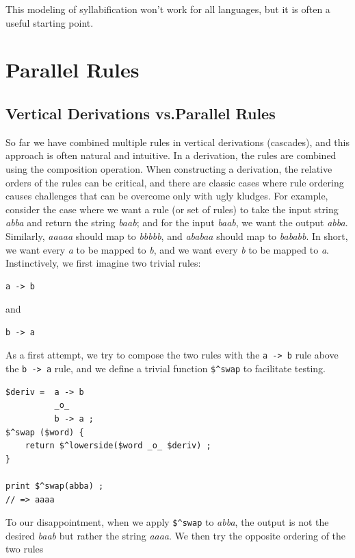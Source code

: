This modeling of syllabification won't work for all languages, but it is often a
useful starting point.

\section{Parallel Rules}

\subsection{Vertical Derivations vs.\@ Parallel Rules}

So far we have combined multiple rules in vertical derivations (cascades), and this
approach is often natural and intuitive.  In a derivation, the rules are combined
using the composition operation.  When constructing a derivation, the relative orders of the
rules can be critical, and there are classic cases where rule ordering causes challenges
that can be overcome only with ugly kludges.  For example, consider the case where we want
a rule (or set of rules) to take the input string \emph{abba} and return the string
\emph{baab}; and for the input \emph{baab}, we want the output \emph{abba}.  Similarly,
\emph{aaaaa} should map to \emph{bbbbb}, and \emph{ababaa} should map to \emph{bababb}.  In
short, we want every \emph{a} to be mapped to \emph{b}, and we want every \emph{b} to be
mapped to \emph{a}.  Instinctively, we first imagine two trivial rules:


\begin{Verbatim}
a -> b 
\end{Verbatim}

\noindent
and

\begin{Verbatim}
b -> a
\end{Verbatim}

As a first attempt, we try to compose the two rules with the \verb!a -> b! rule above the
\verb!b -> a! rule, and we define a trivial function \verb!$^swap! to facilitate testing.


\begin{Verbatim}
$deriv =  a -> b
          _o_
          b -> a ;
$^swap ($word) { 
    return $^lowerside($word _o_ $deriv) ;
}

print $^swap(abba) ;
// => aaaa
\end{Verbatim}

\noindent
To our disappointment, when we apply \verb!$^swap! to \emph{abba}, the output is not the desired
\emph{baab} but rather the string \emph{aaaa}.  We then try the opposite ordering of the
two rules

